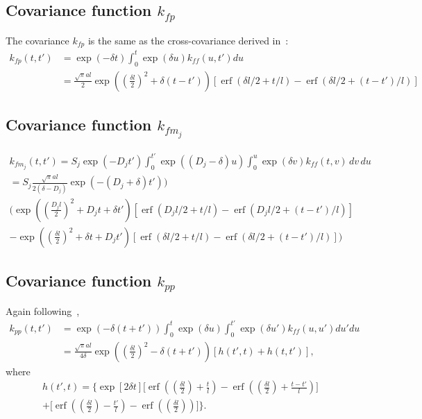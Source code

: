 \documentclass{article}
\newcommand{\erf}{\operatorname{erf}}
\begin{document}
\subsection{Covariance function $k_{fp}$}

The covariance $k_{fp}$ is the same as the cross-covariance derived
in~\cite{Lawrence2007}:
\begin{equation}
  \begin{split}
    k_{fp}(t, t') &= \exp(-\delta t) \int_0^{t} \exp(\delta u) k_{ff}(u, t') du \\
    &= \frac{\sqrt{\pi}al}{2} \exp\left(\left(\frac{\delta l}{2}\right)^2 + \delta (t - t') \right)
    [\erf(\delta l / 2 + t/l) - \erf(\delta l / 2 + (t-t')/l)]
  \end{split}
\end{equation}

\subsection{Covariance function $k_{fm_j}$}

\begin{multline}
  k_{f m_j}(t, t') = S_j \exp(-D_j t') \int_0^{t'}
  \exp((D_j - \delta) u) \int_0^u \exp(\delta v) k_{ff}(t, v)\, dv\, du \\
  = S_j \frac{\sqrt{\pi} al}{2(\delta - D_j)} \exp(-(D_j+\delta) t')) \\
  \bigg(
  \exp\left(\left(\frac{D_j l}{2}\right)^2 + D_j t + \delta t' \right)
  [\erf(D_j l / 2 + t/l) - \erf(D_j l / 2 + (t-t')/l)] \\
  -
  \exp\left(\left(\frac{\delta l}{2}\right)^2 + \delta t + D_j t'\right)
  [\erf(\delta l / 2 + t/l) - \erf(\delta l / 2 + (t-t')/l)]
  \bigg)
\end{multline}

\subsection{Covariance function $k_{pp}$}

Again following~\cite{Lawrence2007},
\begin{align*}
  k_{p p}(t, t') &= \exp(-\delta (t +t')) \int_0^t \exp(\delta u)
  \int_0^{t'} \exp(\delta u') k_{ff}(u, u') du' du \\
  &= \frac{\sqrt{\pi}al}{4 \delta}
  \exp\left(\left(\frac{\delta l}{2}\right)^2 -\delta (t + t')\right) [ h(t', t) +
  h(t, t')],
\end{align*}
where
\begin{multline}
  \label{eq:gpsim_h}
  h(t', t) = 
  \bigg\{ \exp[2 \delta t ] \bigg[
       \erf\left(\left(\frac{\delta l}{2}\right) + \frac{t}{l} \right) - 
       \erf\left(\left(\frac{\delta l}{2}\right) + \frac{t-t'}{l} \right) \bigg] \\
  + \bigg[
       \erf\left(\left(\frac{\delta l}{2}\right) - \frac{t'}{l} \right) -
       \erf\left(\left(\frac{\delta l}{2}\right) \right) \bigg] \bigg\}.
\end{multline}
\end{document}
